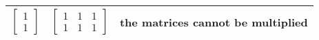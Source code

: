 \begin{table}[]
\begin{tabular}{|c|c|c|}
                $\begin{bmatrix} 1 \\ 1 \end{bmatrix}$                   & $\begin{bmatrix} 1 & 1 & 1 \\ 1 & 1 & 1 \end{bmatrix}$ & the matrices cannot be multiplied                       \\ \hline
                \end{tabular}
            \label{table:testing}
        \end{table}


\newpage